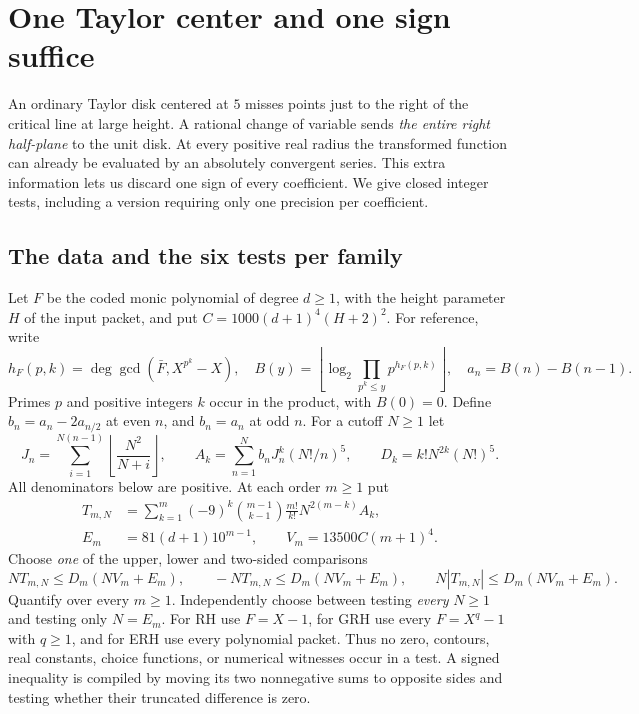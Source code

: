 \section{One Taylor center and one sign suffice}\label{sec:cayley}
An ordinary Taylor disk centered at $5$ misses points just to the right of
the critical line at large height. A rational change of variable sends
\emph{the entire right half-plane} to the unit disk. At every positive
real radius the transformed function can already be evaluated by an
absolutely convergent series. This extra information lets us discard one
sign of every coefficient. We give closed integer tests, including a version
requiring only one precision per coefficient.

\subsection*{The data and the six tests per family}
Let $F$ be the coded monic polynomial of degree $d\ge1$, with the height
parameter $H$ of the input packet, and put $C=1000(d+1)^4(H+2)^2$.
For reference, write
\[
 h_F(p,k)=\deg\gcd(\bar F,X^{p^k}-X),\quad
 B(y)=\left\lfloor\log_2\prod_{p^k\le y}p^{h_F(p,k)}\right\rfloor,
 \quad a_n=B(n)-B(n-1).
\]
Primes $p$ and positive integers $k$ occur in the product, with $B(0)=0$.
Define $b_n=a_n-2a_{n/2}$ at even $n$, and $b_n=a_n$ at odd $n$.
For a cutoff $N\ge1$ let
\[
 J_n=\sum_{i=1}^{N(n-1)}\left\lfloor\frac{N^2}{N+i}\right\rfloor,
 \qquad A_k=\sum_{n=1}^N b_n J_n^k (N!/n)^5,
 \qquad D_k=k!N^{2k}(N!)^5 .
\]
All denominators below are positive. At each order $m\ge1$ put
\begin{align*}
 T_{m,N}
   &=\sum_{k=1}^m (-9)^k\binom{m-1}{k-1}
       \frac{m!}{k!}N^{2(m-k)} A_k,\\
 E_m&=81(d+1)10^{m-1},\qquad V_m=13500C(m+1)^4 .
\end{align*}
Choose \emph{one} of the upper, lower and two-sided comparisons
\begin{equation}\label{eq:cayleytest}
  NT_{m,N}\le D_m(N V_m+E_m),\qquad
  -NT_{m,N}\le D_m(N V_m+E_m),\qquad
  N|T_{m,N}|\le D_m(N V_m+E_m).
\end{equation}
Quantify over every $m\ge1$. Independently choose between testing
\emph{every} $N\ge1$ and testing only $N=E_m$.
For RH use $F=X-1$, for GRH use every $F=X^q-1$ with
$q\ge1$, and for ERH use every polynomial packet. Thus no zero, contours,
real constants, choice functions, or numerical witnesses occur in a test.
A signed inequality is compiled by moving its two nonnegative sums to
opposite sides and testing whether their truncated difference is zero.

